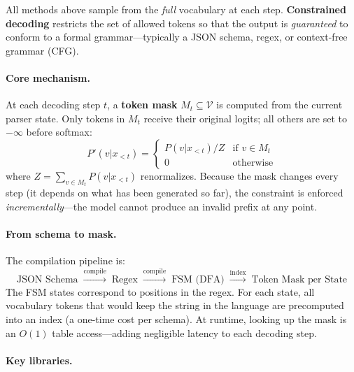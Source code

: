 All methods above sample from the \emph{full} vocabulary at each step. \textbf{Constrained decoding} restricts the set of allowed tokens so that the output is \emph{guaranteed} to conform to a formal grammar---typically a JSON schema, regex, or context-free grammar (CFG).

\paragraph{Core mechanism.}
\label{core-mechanism.}

At each decoding step $t$, a \textbf{token mask} $M_t \subseteq \mathcal{V}$ is computed from the current parser state. Only tokens in $M_t$ receive their original logits; all others are set to $-\infty$ before softmax: 
\[
P'(v | x_{<t}) = \begin{cases}
    P(v | x_{<t}) / Z & \text{if } v \in M_t \\
    0 & \text{otherwise}
  \end{cases}
\]
 where $Z = \sum_{v \in M_t} P(v | x_{<t})$ renormalizes. Because the mask changes every step (it depends on what has been generated so far), the constraint is enforced \emph{incrementally}---the model cannot produce an invalid prefix at any point.

\paragraph{From schema to mask.}
\label{from-schema-to-mask.}

The compilation pipeline is: 
\[
\text{JSON Schema} \;\xrightarrow{\text{compile}}\; \text{Regex}
  \;\xrightarrow{\text{compile}}\; \text{FSM (DFA)}
  \;\xrightarrow{\text{index}}\; \text{Token Mask per State}
\]
 The FSM states correspond to positions in the regex. For each state, all vocabulary tokens that would keep the string in the language are precomputed into an index (a one-time cost per schema). At runtime, looking up the mask is an $O(1)$ table access---adding negligible latency to each decoding step.

\paragraph{Key libraries.}
\label{key-libraries.}

